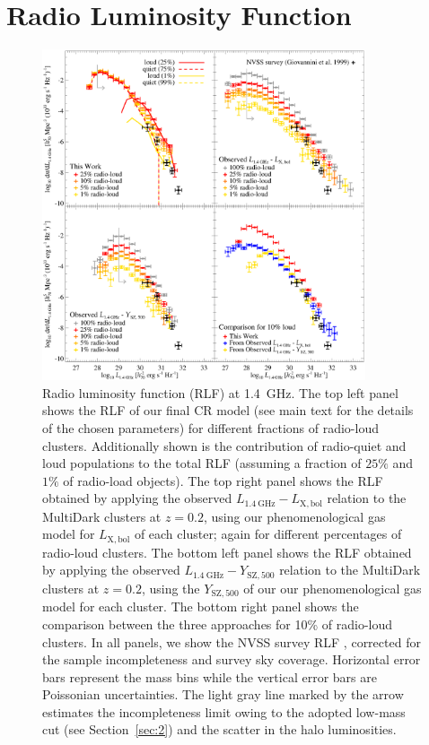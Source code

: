 \documentclass[traditabstract]{aa}
\newcommand{\rmn}{\mathrm}
\begin{document}
\section{Radio Luminosity Function}
\label{sec:5}

\begin{figure}[t]
\centering
\includegraphics[width=0.85\textwidth]{figures/RLFs_1.4.eps}
\caption{Radio luminosity function (RLF) at 1.4~GHz. The top left panel shows
  the RLF of our final CR model (see main text for the details of the chosen
  parameters) for different fractions of radio-loud clusters. Additionally shown
  is the contribution of radio-quiet and loud populations to the total RLF
  (assuming a fraction of $25\%$ and $1\%$ of radio-load objects). The top right
  panel shows the RLF obtained by applying the observed
  $L_{1.4~\rmn{GHz}}-L_{\rmn{X,bol}}$ relation to the MultiDark clusters at $z =
  0.2$, using our phenomenological gas model for $L_{\rmn{X,bol}}$ of each
  cluster; again for different percentages of radio-loud clusters.  The bottom
  left panel shows the RLF obtained by applying the observed
  $L_{1.4~\rmn{GHz}}-Y_{\rmn{SZ}, 500}$ relation to the MultiDark clusters at $z
  = 0.2$, using the $Y_{\rmn{SZ}, 500}$ of our our phenomenological gas model
  for each cluster. The bottom right panel shows the comparison between the
  three approaches for 10\% of radio-loud clusters. In all panels, we show the
  NVSS survey RLF \citep{1999NewA....4..141G}, corrected for the sample
  incompleteness and survey sky coverage. Horizontal error bars represent the
  mass bins while the vertical error bars are Poissonian uncertainties. The
  light gray line marked by the arrow estimates the incompleteness limit owing
  to the adopted low-mass cut (see Section~\ref{sec:2}) and the scatter in the
  halo luminosities.}
\label{fig:RLF_1.4}
\end{figure}
\end{document}
